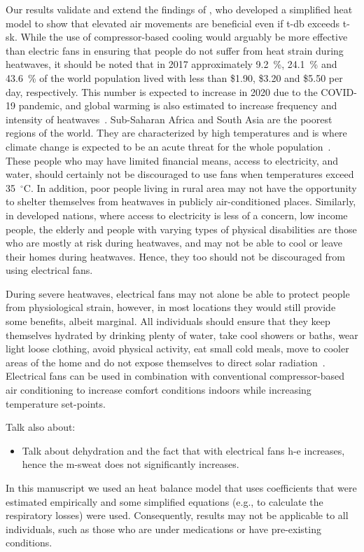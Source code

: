 Our results validate and extend the findings of , who developed a simplified heat model to show that elevated air movements are beneficial even if \ac{t-db} exceeds \acf{t-sk}.
While the use of compressor-based cooling would arguably be more effective than electric fans in ensuring that people do not suffer from heat strain during heatwaves, it should be noted that in 2017 approximately 9.2~\%, 24.1~\% and 43.6~\% of the world population lived with less than \$1.90, \$3.20 and \$5.50 per day, respectively.
This number is expected to increase in 2020 due to the COVID-19 pandemic, and global warming is also estimated to increase frequency and intensity of heatwaves~\cite{PovertyO1:online}.
Sub-Saharan Africa and South Asia are the poorest regions of the world.
They are characterized by high temperatures and is where climate change is expected to be an acute threat for the whole population~\cite{PovertyO1:online}.
These people who may have limited financial means, access to electricity, and water, should certainly not be discouraged to use fans when temperatures exceed 35~$^{\circ}$C\@.
In addition, poor people living in rural area may not have the opportunity to shelter themselves from heatwaves in publicly air-conditioned places.
Similarly, in developed nations, where access to electricity is less of a concern, low income people, the elderly and people with varying types of physical disabilities are those who are mostly at risk during heatwaves, and may not be able to cool or leave their homes during heatwaves.
Hence, they too should not be discouraged from using electrical fans.

During severe heatwaves, electrical fans may not alone be able to protect people from physiological strain, however, in most locations they would still provide some benefits, albeit marginal.
All individuals should ensure that they keep themselves hydrated by drinking plenty of water, take cool showers or baths, wear light loose clothing, avoid physical activity, eat small cold meals, move to cooler areas of the home and do not expose themselves to direct solar radiation~\cite{HeatandH28:online}.
Electrical fans can be used in combination with conventional compressor-based air conditioning to increase comfort conditions indoors while increasing temperature set-points.

Talk also about:
\begin{itemize}
    \item Talk about dehydration and the fact that with electrical fans \ac{h-e} increases, hence the \ac{m-sweat} does not significantly increases. %
\end{itemize}

In this manuscript we used an heat balance model that uses coefficients that were estimated empirically and some simplified equations (e.g., to calculate the respiratory losses) were used.
Consequently, results may not be applicable to all individuals, such as those who are under medications or have pre-existing conditions.
